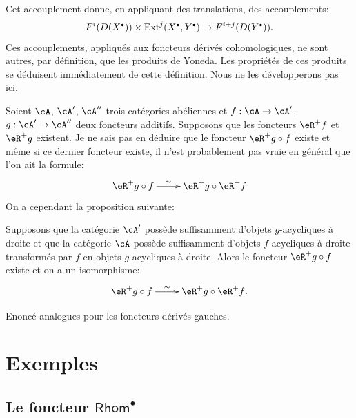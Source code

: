 Cet accouplement donne, en appliquant des translations, des accouplements: 
\[
  F^i(D(X^\bullet))\times \ext^j(X^\bullet,Y^\bullet) \to F^{i+j}(D(Y^\bullet)) \text{.}
\]
Ces accouplements, appliqués aux foncteurs dérivés cohomologiques, ne 
sont autres, par définition, que les produits de Yoneda. Les propriétés 
de ces produits se déduisent immédiatement de cette définition. Nous ne 
les développerons pas ici. 

Soient $\cA$, $\cA'$, $\cA''$ trois catégories abéliennes et 
$f:\cA\to \cA'$, $g:\cA'\to \cA''$ deux foncteurs additifs. Supposons que les 
foncteurs $\eR^+ f$ et $\eR^+ g$ existent. Je ne sais pas en déduire que le 
foncteur $\eR^+ g\circ f$ existe et même si ce dernier foncteur existe, il 
n'est probablement pas vraie en général que l'on ait la formule: 
\[\xymatrix{
  \eR^+ g\circ f\ar[r]^-\sim 
    & \eR^+ g \circ \eR^+ f 
}\]
On a cependant la proposition suivante: 





\begin{proposition}\label{VIII:4-3-1}
Supposons que la catégorie $\cA'$ possède suffisamment d'objets 
$g$-acycliques à droite et que la catégorie $\cA$ possède suffisamment 
d'objets $f$-acycliques à droite transformés par $f$ en objets 
$g$-acycliques à droite. Alors le foncteur $\eR^+ g\circ f$ existe et on a un 
isomorphisme: 
\[\xymatrix{
  \eR^+ g\circ f \ar[r]^-\sim 
    & \eR^+ g \circ \eR^+ f \text{.}
}\]
\end{proposition}

Enoncé analogues pour les foncteurs dérivés gauches. 















\section{Exemples}\label{VIII:6} %










\subsection{Le foncteur \texorpdfstring{$\mathsf{Rhom}^\bullet$}{Hom*}}\label{VIII:6-1}

